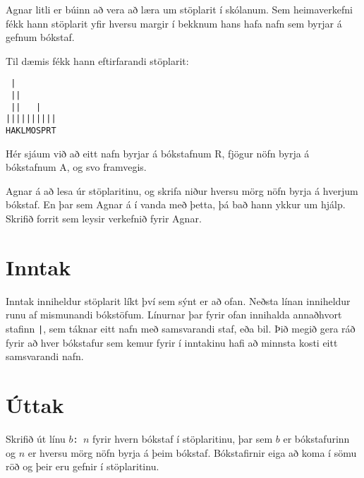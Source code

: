 

Agnar litli er búinn að vera að læra um stöplarit í skólanum. Sem heimaverkefni
fékk hann stöplarit yfir hversu margir í bekknum hans hafa nafn sem byrjar á
gefnum bókstaf.

Til dæmis fékk hann eftirfarandi stöplarit:

\begin{center}
\begin{verbatim}
 |        
 ||       
 ||   |   
||||||||||
HAKLMOSPRT
\end{verbatim}
\end{center}

Hér sjáum við að eitt nafn byrjar á bókstafnum R, fjögur nöfn byrja á
bókstafnum A, og svo framvegis.

Agnar á að lesa úr stöplaritinu, og skrifa niður hversu mörg nöfn byrja á
hverjum bókstaf. En þar sem Agnar á í vanda með þetta, þá bað hann ykkur um
hjálp. Skrifið forrit sem leysir verkefnið fyrir Agnar.

\section*{Inntak}
Inntak inniheldur stöplarit líkt því sem sýnt er að ofan. Neðsta línan
inniheldur runu af mismunandi bókstöfum. Línurnar þar fyrir ofan innihalda
annaðhvort stafinn \texttt{|}, sem táknar eitt nafn með samsvarandi staf, eða
bil. Þið megið gera ráð fyrir að hver bókstafur sem kemur fyrir í inntakinu
hafi að minnsta kosti eitt samsvarandi nafn.

\section*{Úttak}
Skrifið út línu \texttt{$b$: $n$} fyrir hvern bókstaf í stöplaritinu, þar sem
$b$ er bókstafurinn og $n$ er hversu mörg nöfn byrja á þeim bókstaf.
Bókstafirnir eiga að koma í sömu röð og þeir eru gefnir í stöplaritinu.

